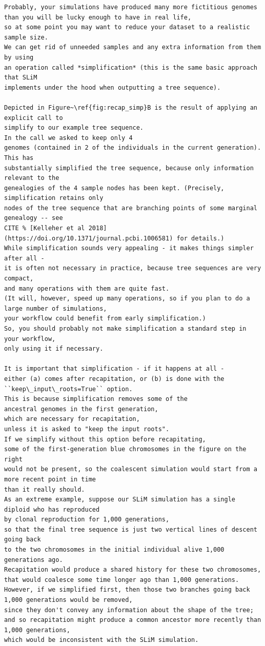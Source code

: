 \documentclass[12pt]{article}
\begin{document}
\begin{lstlisting}[language=slim]
Probably, your simulations have produced many more fictitious genomes
than you will be lucky enough to have in real life,
so at some point you may want to reduce your dataset to a realistic sample size.
We can get rid of unneeded samples and any extra information from them by using
an operation called *simplification* (this is the same basic approach that SLiM
implements under the hood when outputting a tree sequence).

Depicted in Figure~\ref{fig:recap_simp}B is the result of applying an explicit call to
simplify to our example tree sequence.
In the call we asked to keep only 4
genomes (contained in 2 of the individuals in the current generation). This has
substantially simplified the tree sequence, because only information relevant to the
genealogies of the 4 sample nodes has been kept. (Precisely, simplification retains only
nodes of the tree sequence that are branching points of some marginal genealogy -- see
CITE % [Kelleher et al 2018](https://doi.org/10.1371/journal.pcbi.1006581) for details.)
While simplification sounds very appealing - it makes things simpler after all -
it is often not necessary in practice, because tree sequences are very compact,
and many operations with them are quite fast.
(It will, however, speed up many operations, so if you plan to do a large number of simulations,
your workflow could benefit from early simplification.)
So, you should probably not make simplification a standard step in your workflow,
only using it if necessary.

It is important that simplification - if it happens at all -
either (a) comes after recapitation, or (b) is done with the
``keep\_input\_roots=True`` option.
This is because simplification removes some of the
ancestral genomes in the first generation,
which are necessary for recapitation,
unless it is asked to "keep the input roots".
If we simplify without this option before recapitating,
some of the first-generation blue chromosomes in the figure on the right
would not be present, so the coalescent simulation would start from a more recent point in time
than it really should.
As an extreme example, suppose our SLiM simulation has a single diploid who has reproduced
by clonal reproduction for 1,000 generations,
so that the final tree sequence is just two vertical lines of descent going back
to the two chromosomes in the initial individual alive 1,000 generations ago.
Recapitation would produce a shared history for these two chromosomes,
that would coalesce some time longer ago than 1,000 generations.
However, if we simplified first, then those two branches going back 1,000 generations would be removed,
since they don't convey any information about the shape of the tree;
and so recapitation might produce a common ancestor more recently than 1,000 generations,
which would be inconsistent with the SLiM simulation.


\end{lstlisting}
\end{document}
